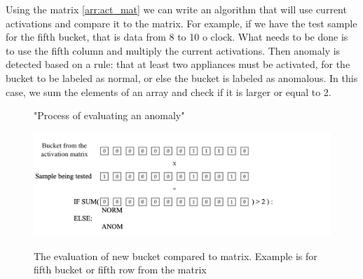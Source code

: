 Using the matrix \ref{arr:act_mat} we can write an algorithm that will use current activations 
and compare it to the matrix. For example, if we have the test sample for the fifth bucket, that is 
data from 8 to 10 o clock. 
What needs to be done is to use the fifth column and multiply the current activations.
Then anomaly is detected based on a rule: that at least two appliances must be activated, for the bucket to be labeled as normal,
or else the bucket is labeled as anomalous. In this case, we sum the elements of an array and check if it is larger or equal to 2. 

        

\begin{figure}[H]
    \centering
    \caption{"Process of evaluating an anomaly"}
    \includegraphics[width=1\linewidth]{../Figures/EC/EC_anom_dect.png}
    \label{fig:anom_detct}
    \caption{The evaluation of new bucket compared to matrix. Example is for fifth bucket or fifth row from the matrix}
    
\end{figure}

